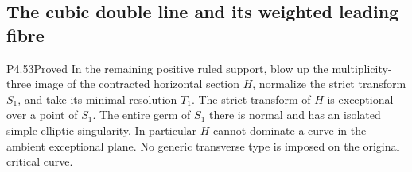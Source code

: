 \subsection{The cubic double line and its weighted leading fibre}

\begin{statement}{P4.53}{Proved}
In the remaining positive ruled support, blow up the
multiplicity-three image of the contracted horizontal
section $H$, normalize the strict transform $S_1$, and
take its minimal resolution $T_1$. The strict transform
of $H$ is exceptional over a point of $S_1$. The entire
germ of $S_1$ there is normal and has an isolated simple
elliptic singularity. In particular $H$ cannot dominate
a curve in the ambient exceptional plane. No generic
transverse type is imposed on the original critical curve.
\end{statement}
